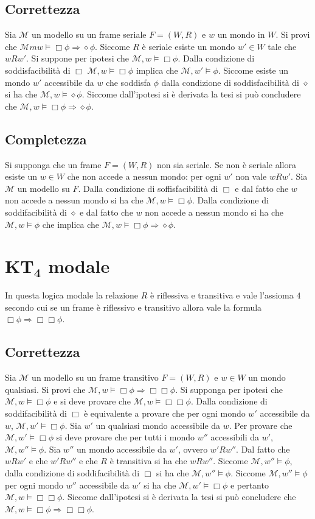\subsection{Correttezza}
Sia $\mathcal{M}$ un modello su un frame seriale $F=(W, R)$ e $w$ un mondo in $W$. Si provi che $\mathcal{M}m w\models\Box\phi\Rightarrow\diamond\phi$. Siccome $R$ \`e seriale esiste un mondo 
$w'\in W$ tale che $wRw'$. Si suppone per ipotesi che $\mathcal{M}, w\models\Box\phi$. Dalla condizione di soddisfacibilit\`a di $\Box$ $\mathcal{M},w\models\Box\phi$ implica che $\mathcal{M}, w'
\models\phi$. Siccome esiste un mondo $w'$ accessibile da $w$ che soddisfa $\phi$ dalla condizione di soddisfacibilit\`a di $\diamond $ si ha che $\mathcal{M}, w\models\diamond\phi$. Siccome 
dall'ipotesi si \`e derivata la tesi si pu\`o concludere che $\mathcal{M}, w\models\Box\phi\Rightarrow\diamond\phi$.
\subsection{Completezza}
Si supponga che un frame $F=(W,R)$ non sia seriale. Se non \`e seriale allora esiste un $w\in W$ che non accede a nessun mondo: per ogni $w'$ non vale $wRw'$. Sia $\mathcal{M}$ un modello su $F$.
Dalla condizione di soffisfacibilit\`a di $\Box$ e dal fatto che $w$ non accede a nessun mondo si ha che $\mathcal{M}, w\models\Box\phi$. Dalla condizione di soddifacibilit\`a di $\diamond$ e dal fatto
che $w$ non accede a nessun mondo si ha che $\mathcal{M}, w\models\phi$ che implica che $\mathcal{M}, w\models\Box\phi\Rightarrow\diamond\phi$.
\section{$\mathbf{KT_4}$ modale}
In questa logica modale la relazione $R$ \`e riflessiva e transitiva e vale l'assioma $4$ secondo cui se un frame \`e riflessivo e transitivo allora vale la formula $\Box\phi\Rightarrow\Box\Box\phi$.
\subsection{Correttezza}
Sia $\mathcal{M}$ un modello su un frame transitivo $F=(W, R)$ e $w\in W$ un mondo qualsiasi. Si provi che $\mathcal{M}, w\models\Box\phi\Rightarrow\Box\Box\phi$. Si supponga per ipotesi che
$\mathcal{M}, w\models\Box\phi$ e si deve provare che $\mathcal{M}, w\models\Box\Box\phi$. Dalla condizione di soddifacibilit\`a di $\Box$ \`e equivalente a provare che per ogni mondo $w'$ accessibile
da $w$, $\mathcal{M}, w'\models\Box\phi$. Sia $w'$ un qualsiasi mondo accessibile da $w$. Per provare che $\mathcal{M}, w'\models\Box\phi$ si deve provare che per tutti i mondo $w''$ accessibili da 
$w'$, $\mathcal{M}, w''\models\phi$. Sia $w''$ un mondo accessibile da $w'$, ovvero $w'Rw''$. Dal fatto che $wRw'$ e che $w'Rw''$ e che $R$ \`e transitiva si ha che $wRw''$. Siccome $\mathcal{M}, 
w''\models\phi$, dalla condizione di soddifacibilit\`a di $\Box$ si ha che $\mathcal{M}, w''\models\phi$. Siccome $\mathcal{M}, w''\models\phi$ per ogni mondo $w''$ accessibile da $w'$ si ha che 
$\mathcal{M}, w'\models\Box\phi$ e pertanto $\mathcal{M}, w\models\Box\Box\phi$. Siccome dall'ipotesi si \`e derivata la tesi si pu\`o concludere che $\mathcal{M}, 
w\models\Box\phi\Rightarrow\Box\Box\phi$.
